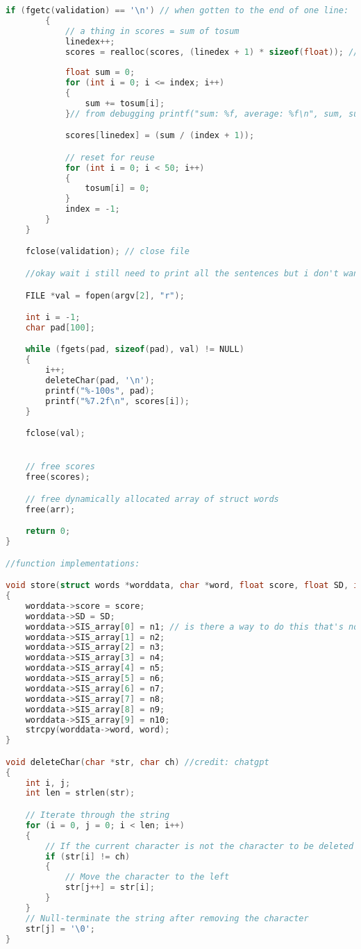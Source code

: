 \documentclass{article}
\begin{document}
\begin{lstlisting}[language=C, caption=main.c]
        if (fgetc(validation) == '\n') // when gotten to the end of one line:
        {
            // a thing in scores = sum of tosum
            linedex++;
            scores = realloc(scores, (linedex + 1) * sizeof(float)); // get space each time so it's flexy to sizey of filey again
            
            float sum = 0;
            for (int i = 0; i <= index; i++)
            {
                sum += tosum[i];
            }// from debugging printf("sum: %f, average: %f\n", sum, sum / (index + 1));

            scores[linedex] = (sum / (index + 1));

            // reset for reuse
            for (int i = 0; i < 50; i++)
            {
                tosum[i] = 0;
            }
            index = -1;
        }
    }

    fclose(validation); // close file

    //okay wait i still need to print all the sentences but i don't wanna touch any code above here so ill just reopen and reclose validation

    FILE *val = fopen(argv[2], "r");

    int i = -1;
    char pad[100];

    while (fgets(pad, sizeof(pad), val) != NULL)
    {
        i++;
        deleteChar(pad, '\n');
        printf("%-100s", pad);
        printf("%7.2f\n", scores[i]);
    }

    fclose(val);


    // free scores
    free(scores);

    // free dynamically allocated array of struct words
    free(arr);

    return 0;
}

//function implementations:

void store(struct words *worddata, char *word, float score, float SD, int n1, int n2, int n3, int n4, int n5, int n6, int n7, int n8, int n9, int n10)
{
    worddata->score = score;
    worddata->SD = SD;
    worddata->SIS_array[0] = n1; // is there a way to do this that's not manually stating each thing
    worddata->SIS_array[1] = n2;
    worddata->SIS_array[2] = n3;
    worddata->SIS_array[3] = n4;
    worddata->SIS_array[4] = n5;
    worddata->SIS_array[5] = n6;
    worddata->SIS_array[6] = n7;
    worddata->SIS_array[7] = n8;
    worddata->SIS_array[8] = n9;
    worddata->SIS_array[9] = n10;
    strcpy(worddata->word, word);
}

void deleteChar(char *str, char ch) //credit: chatgpt
{
    int i, j;
    int len = strlen(str);

    // Iterate through the string
    for (i = 0, j = 0; i < len; i++)
    {
        // If the current character is not the character to be deleted
        if (str[i] != ch)
        {
            // Move the character to the left
            str[j++] = str[i];
        }
    }
    // Null-terminate the string after removing the character
    str[j] = '\0';
}

\end{lstlisting}
\end{document}
